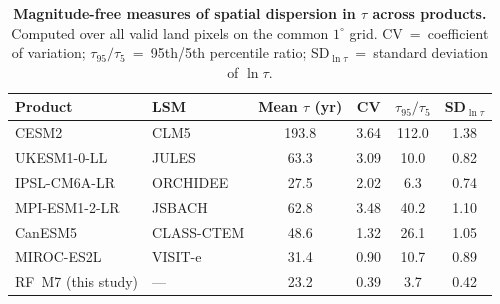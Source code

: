 \documentclass[12pt, a4paper]{article}
\begin{document}
\begin{table}[h!]
  \centering\small
  \caption{\textbf{Magnitude-free measures of spatial dispersion in $\tau$ across
  products.} Computed over all valid land pixels on the common $1^{\circ}$ grid.
  CV~=~coefficient of variation; $\tau_{95}/\tau_{5}$~=~95th/5th percentile ratio;
  SD$_{\ln\tau}$~=~standard deviation of $\ln\tau$.}
  \label{stab:esm_dispersion}
  \begin{tabular}{llcccc}
    \toprule
    Product & LSM & Mean $\tau$ (yr) & CV & $\tau_{95}/\tau_{5}$ & SD$_{\ln\tau}$ \\
    \midrule
    CESM2 & CLM5 & 193.8 & 3.64 & 112.0 & 1.38 \\
    UKESM1-0-LL & JULES & 63.3 & 3.09 & 10.0 & 0.82 \\
    IPSL-CM6A-LR & ORCHIDEE & 27.5 & 2.02 & 6.3 & 0.74 \\
    MPI-ESM1-2-LR & JSBACH & 62.8 & 3.48 & 40.2 & 1.10 \\
    CanESM5 & CLASS-CTEM & 48.6 & 1.32 & 26.1 & 1.05 \\
    MIROC-ES2L & VISIT-e & 31.4 & 0.90 & 10.7 & 0.89 \\
    \midrule
    RF~M7 (this study) & --- & 23.2 & 0.39 & 3.7 & 0.42 \\
    \bottomrule
  \end{tabular}
\end{table}



\end{document}

